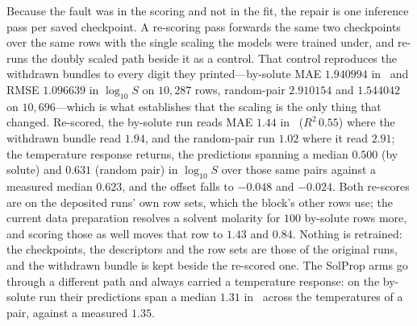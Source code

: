 Because the fault was in the scoring and not in the fit, the repair is one inference pass per saved
checkpoint. A re-scoring pass forwards the same two
checkpoints over the same rows with the single scaling the models were trained under, and re-runs the
doubly scaled path beside it as a control. That control reproduces the withdrawn bundles to every
digit they printed---by-solute MAE $1.940994$ in \lnx\ and RMSE $1.096639$ in $\log_{10}S$ on
$10{,}287$ rows, random-pair $2.910154$ and $1.544042$ on $10{,}696$---which is what establishes that
the scaling is the only thing that changed. Re-scored, the by-solute run reads MAE $1.44$ in \lnx\
($R^2\,0.55$) where the withdrawn bundle read $1.94$, and the random-pair run $1.02$ where it read
$2.91$; the temperature response returns, the predictions spanning a median $0.500$ (by solute) and
$0.631$ (random pair) in $\log_{10}S$ over those same pairs against a measured median $0.623$, and
the offset falls to $-0.048$ and $-0.024$. Both re-scores are on the deposited runs' own row sets,
which the block's other rows use; the current data preparation resolves a solvent molarity for $100$
by-solute rows more, and scoring those as well moves that row to $1.43$ and $0.84$. Nothing is
retrained: the checkpoints, the descriptors and the row sets are those of the original runs, and the
withdrawn bundle is kept beside the re-scored one. The SolProp arms go through a different path and always carried a
temperature response: on the by-solute run their predictions span a median $1.31$ in \lnx\ across the
temperatures of a pair, against a measured $1.35$.

